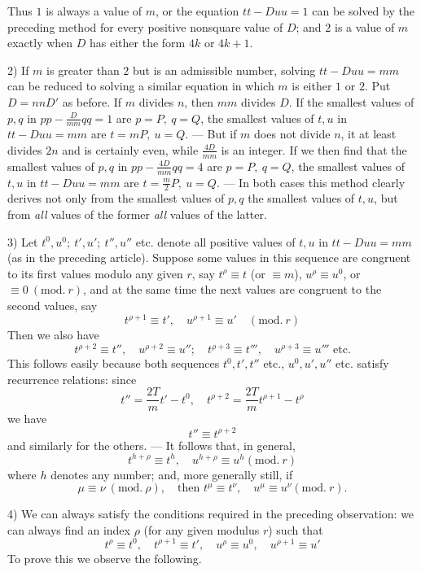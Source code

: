Thus \(1\) is always a value of \(m\), or the equation \(tt-Duu=1\) can be solved by the preceding method for every positive nonsquare value of \(D\); and \(2\) is a value of \(m\) exactly when \(D\) has either the form \(4k\) or \(4k+1\).

2) If \(m\) is greater than \(2\) but is an admissible number, solving \(tt-Duu=mm\) can be reduced to solving a similar equation in which \(m\) is either \(1\) or \(2\). Put \(D=nnD'\) as before. If \(m\) divides \(n\), then \(mm\) divides \(D\). If the smallest values of \(p,q\) in \(pp-\frac{D}{mm}qq=1\) are \(p=P,\ q=Q\), the smallest values of \(t,u\) in \(tt-Duu=mm\) are \(t=mP,\ u=Q\). --- But if \(m\) does not divide \(n\), it at least divides \(2n\) and is certainly even, while \(\frac{4D}{mm}\) is an integer. If we then find that the smallest values of \(p,q\) in \(pp-\frac{4D}{mm}qq=4\) are \(p=P,\ q=Q\), the smallest values of \(t,u\) in \(tt-Duu=mm\) are \(t=\frac{m}{2}P,\ u=Q\). --- In both cases this method clearly derives not only from the smallest values of \(p,q\) the smallest values of \(t,u\), but from \textit{all} values of the former \textit{all} values of the latter.

3) Let \(t^0,u^0;\ t',u';\ t'',u''\) etc. denote all positive values of
\(t,u\) in \(tt-Duu=mm\) (as in the preceding article). Suppose some values in this sequence are congruent to its first values modulo any given \(r\), say \(t^\rho\equiv t\) (or \(\equiv m\)), \(u^\rho\equiv u^0\), or \(\equiv0\ (\mathrm{mod.}\ r)\), and at the same time the next values are congruent to the second values, say
\[
t^{\rho+1}\equiv t',\quad u^{\rho+1}\equiv u'\quad(\mathrm{mod.}\ r)
\]
Then we also have
\[
t^{\rho+2}\equiv t'',\quad u^{\rho+2}\equiv u'';\quad t^{\rho+3}\equiv t''',\quad u^{\rho+3}\equiv u'''\text{ etc.}
\]
This follows easily because both sequences \(t^0,t',t''\) etc., \(u^0,u',u''\) etc. satisfy recurrence relations: since
\[
t''=\frac{2T}{m}t'-t^0,\quad t^{\rho+2}=\frac{2T}{m}t^{\rho+1}-t^\rho
\]
we have
\[
t''\equiv t^{\rho+2}
\]
and similarly for the others. --- It follows that, in general,
\[
t^{h+\rho}\equiv t^h,\quad u^{h+\rho}\equiv u^h(\mathrm{mod.}\ r)
\]
where \(h\) denotes any number; and, more generally still, if
\[
\mu\equiv\nu\ (\mathrm{mod.}\ \rho),\quad\text{then }t^\mu\equiv t^\nu,\quad u^\mu\equiv u^\nu(\mathrm{mod.}\ r).
\]

4) We can always satisfy the conditions required in the preceding observation: we can always find an index \(\rho\) (for any given modulus \(r\)) such that
\[
t^\rho\equiv t^0,\quad t^{\rho+1}\equiv t',\quad u^\rho\equiv u^0,\quad u^{\rho+1}\equiv u'
\]
To prove this we observe the following.

